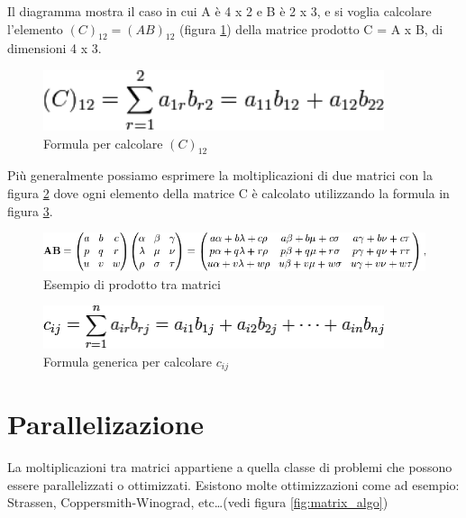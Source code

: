 Il diagramma mostra il caso in cui A \`{e} 4 x 2 e B \`{e} 2 x 3, e si voglia calcolare l'elemento $(C)_{12} = (AB)_{12}$ (figura \ref{fig:formula_c}) della matrice prodotto C = A x B, di dimensioni 4 x 3.

\begin{figure}[htbp]
    \begin{center}
        \includegraphics[width=10cm]{immagini/matrix_multiplication_formula_c.png}
    \end{center}
    \caption{Formula per calcolare $(C)_{12}$}
    \label{fig:formula_c}
\end{figure}

Pi\`{u} generalmente possiamo esprimere la moltiplicazioni di due matrici con la figura \ref{fig:matrix_multiplication_generic} dove ogni elemento della matrice C \`{e} calcolato utilizzando la formula in figura \ref{fig:matrix_multiplication_generic_formula}.

\begin{figure}[htbp]
    \begin{center}
        \includegraphics[width=15cm]{immagini/matrix_multiplication_generic.png}
    \end{center}
    \caption{Esempio di prodotto tra matrici}
    \label{fig:matrix_multiplication_generic}
\end{figure}

\begin{figure}[htbp]
    \begin{center}
        \includegraphics[width=10cm]{immagini/matrix_multiplication_generic_formula.png}
    \end{center}
    \caption{Formula generica per calcolare $c_{ij}$}
    \label{fig:matrix_multiplication_generic_formula}
\end{figure}

\section{Parallelizazione}
La moltiplicazioni tra matrici appartiene a quella classe di problemi che possono essere parallelizzati o ottimizzati.
Esistono molte ottimizzazioni come ad esempio: Strassen, Coppersmith-Winograd, etc\ldots (vedi figura \ref{fig:matrix_algo})

